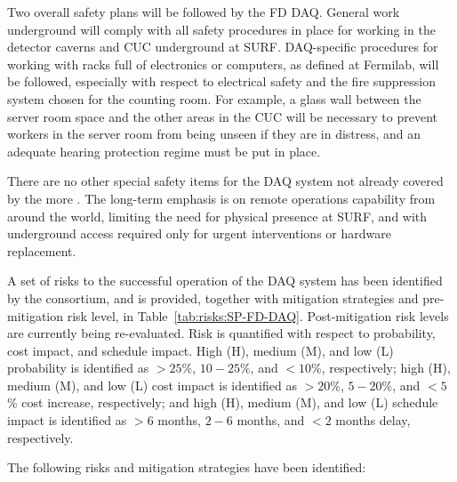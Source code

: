 Two overall safety plans will be followed by the FD DAQ. General work underground will comply
with all safety procedures in place for working in the detector caverns and CUC underground at
SURF. DAQ-specific procedures for working with racks full of
electronics or computers, as defined 
at Fermilab, will be followed, especially with respect to electrical safety and the fire suppression
system chosen for the counting room. For example, a glass wall between the server room space and
the other areas in the CUC will be necessary to prevent workers in the server room from being
unseen if they are in distress, and an adequate hearing protection
regime must be put in place.

There are no other special safety items for the DAQ system not already covered by the more
. The long-term emphasis is on remote operations capability
from around the world, limiting the need for physical presence at
SURF, and with underground access required only for urgent
interventions or hardware replacement. 

A set of risks to the successful operation of the DAQ system has been
identified by the consortium, and is provided,
together with mitigation strategies and pre-mitigation risk level, 
in Table~\ref{tab:risks:SP-FD-DAQ}. Post-mitigation risk levels are
currently being re-evaluated. Risk is quantified with respect to
probability, cost impact, and schedule impact. High (H), medium (M), and low (L)
probability is identified as
$>25$\%, $10-25$\%, and $<10$\%, respectively; high (H), medium (M), and low (L)
cost impact is identified as
$>20$\%, $5-20$\%, and $<5$\% cost increase, respectively; and high
(H), medium (M), and low (L) schedule impact is identified as 
$>6$ months, $2-6$ months, and $<2$ months delay, respectively.




The following risks and mitigation strategies have been identified:

